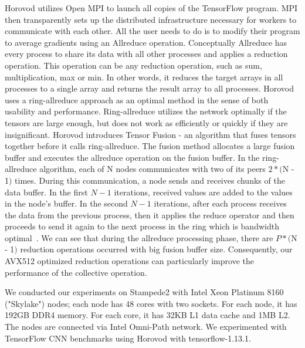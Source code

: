 \documentclass[sigconf]{acmart}
\begin{document}
Horovod utilizes Open MPI to launch all copies of the TensorFlow program. MPI then transparently sets up the distributed infrastructure necessary for workers to communicate with each other. All the user needs to do is to
modify their program to average gradients using an Allreduce operation. Conceptually Allreduce has every process to share its data with all other processes and applies a reduction operation. This operation can be any reduction operation, such as sum, multiplication, max or min. In other words, it reduces the target arrays in all processes
to a single array and returns the result array to all processes. Horovod uses a ring-allreduce approach as an optimal method in the sense of both usability and performance.
Ring-allreduce utilizes the network optimally if the tensors are large enough, but does not
work as efficiently or quickly if they are insignificant. Horovod introduces Tensor Fusion - an algorithm that fuses tensors together before it calls ring-allreduce. The fusion method allocates a large fusion buffer and executes the allreduce operation on the fusion buffer.
In the ring-allreduce algorithm, each of N nodes communicates with two of its
peers $2 * ($N - 1$)$ times. During this communication, a node sends and receives chunks of the data
buffer. In the first $N - 1$ iterations, received values are added to the values in the node's buffer. In
the second $N - 1$ iterations, after each process receives the data from the previous process, then it
applies the reduce operator and then proceeds to send it again to the next process in the ring which is bandwidth optimal~\cite{allreduce-optimal}. We can see that during the allreduce processing phase, there are $P * ($N - 1$)$ reduction operations occurred with big fusion buffer size. Consequently, our AVX512 optimized reduction operations can particularly improve the performance of the collective operation.

We conducted our experiments on Stampede2 with Intel Xeon Platinum 8160 ("Skylake") nodes; each node has 48 cores with two sockets. For each node, it has 192GB DDR4 memory. For each core, it has 32KB L1 data cache and 1MB L2. The nodes are connected via Intel Omni-Path network.
We experimented with TensorFlow CNN benchmarks using Horovod with tensorflow-1.13.1.
\end{document}
